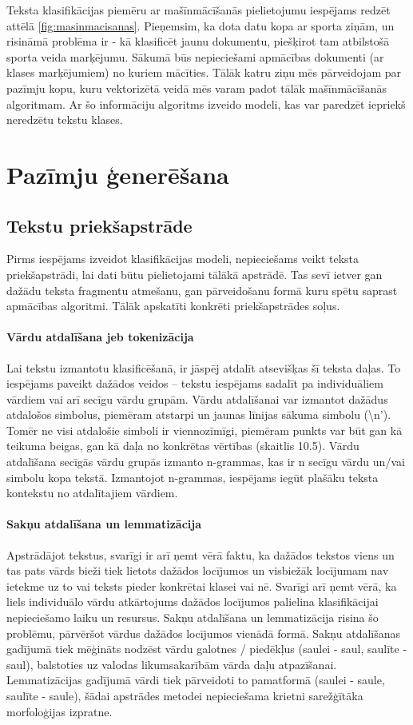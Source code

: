 Teksta klasifikācijas piemēru ar mašīnmācīšanās pielietojumu iespējams redzēt attēlā  \ref{fig:masinmacisanas}. Pieņemsim, ka dota datu kopa ar sporta ziņām, un risināmā problēma ir - kā klasificēt jaunu dokumentu, piešķirot tam atbilstošā sporta veida marķējumu. Sākumā būs nepieciešami apmācības dokumenti (ar klases marķējumiem) no kuriem mācīties. Tālāk katru ziņu mēs pārveidojam par pazīmju kopu, kuru vektorizētā veidā mēs varam padot tālāk mašīnmācīšanās algoritmam. Ar šo informāciju algoritms izveido modeli, kas var paredzēt iepriekš neredzētu tekstu klases.

\chapter{Pazīmju ģenerēšana}
\section{Tekstu priekšapstrāde}
Pirms iespējams izveidot klasifikācijas modeli, nepieciešams veikt teksta priekšapstrādi, lai dati būtu pielietojami tālākā apstrādē. Tas sevī ietver gan dažādu teksta fragmentu atmešanu, gan pārveidošanu formā kuru spētu saprast apmācības algoritmi. Tālāk apskatīti konkrēti priekšapstrādes soļus.

\subsubsection{Vārdu atdalīšana jeb tokenizācija}
Lai tekstu izmantotu klasificēšanā, ir jāspēj atdalīt atsevišķas šī teksta daļas. To iespējams paveikt dažādos veidos – tekstu iespējams sadalīt pa individuāliem vārdiem vai arī  secīgu vārdu grupām. Vārdu atdalīšanai var izmantot dažādus atdalošos simbolus, piemēram atstarpi un jaunas līnijas sākuma simbolu (\textbackslash n’). Tomēr ne visi atdalošie simboli ir viennozīmīgi, piemēram punkts var būt gan kā teikuma beigas, gan kā daļa no konkrētas vērtības (skaitlis 10.5).
Vārdu atdalīšana secīgās vārdu grupās izmanto n-grammas, kas ir n secīgu vārdu un/vai simbolu kopa tekstā. Izmantojot n-grammas, iespējams iegūt plašāku teksta kontekstu no atdalītajiem vārdiem.

\subsubsection{Sakņu atdalīšana un lemmatizācija}
Apstrādājot tekstus, svarīgi ir arī ņemt vērā faktu, ka dažādos tekstos viens un tas pats vārds bieži tiek lietots dažādos locījumos un visbiežāk locījumam nav ietekme uz to vai teksts pieder konkrētai klasei vai nē. Svarīgi arī ņemt vērā, ka liels individuālo vārdu atkārtojums dažādos locījumos palielina klasifikācijai nepieciešamo laiku un resursus. Sakņu atdalīšana un lemmatizācija risina šo problēmu, pārvēršot vārdus dažādos locījumos vienādā formā. Sakņu atdalīšanas gadījumā tiek mēģināts nodzēst vārdu galotnes / piedēkļus (saulei - saul, saulīte - saul), balstoties uz valodas likumsakarībām vārda daļu atpazīšanai. Lemmatizācijas gadījumā vārdi tiek pārveidoti to pamatformā (saulei - saule, saulīte - saule), šādai apstrādes metodei nepieciešama krietni sarežģītāka morfoloģijas izpratne.

